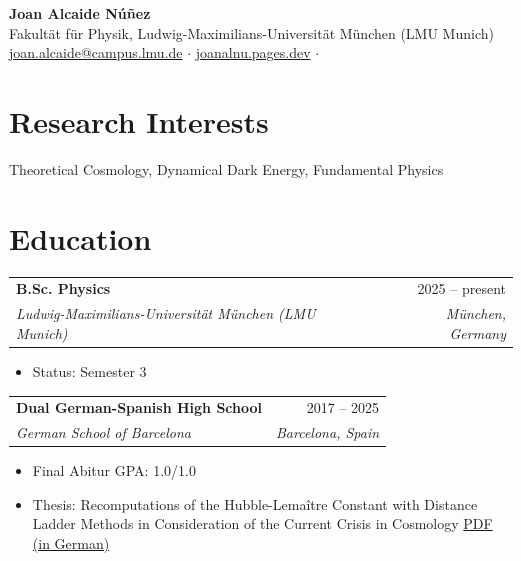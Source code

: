 \documentclass[11pt, letterpaper]{article}
\makeatletter
\newcommand{\cvheading}[4]{
  \noindent
  \begin{tabular*}{\textwidth}{@{\extracolsep{\fill}} lr}
    \textbf{#1} & #2 \\
    \textit{#3} & \textit{#4} \\
  \end{tabular*}\vspace{-2pt}
}
\makeatother
\begin{document}
\begin{center}
    {\Huge \bfseries \color{primary} Joan Alcaide Núñez} \\[6pt]
    Fakultät für Physik, Ludwig-Maximilians-Universität München (LMU Munich) \\
    \href{mailto:joan.alcaide@campus.lmu.de}{joan.alcaide@campus.lmu.de} $\cdot$ 
    \href{https://joanalnu.pages.dev}{joanalnu.pages.dev} $\cdot$ 
\end{center}

\vspace{-6pt}

\section{Research Interests}
Theoretical Cosmology, Dynamical Dark Energy, Fundamental Physics

\section{Education}

\cvheading
  {B.Sc. Physics} {2025 -- present}
  {Ludwig-Maximilians-Universität München (LMU Munich)} {München, Germany}
  \begin{itemize}[noitemsep, topsep=1pt, leftmargin=1.5em]
      \item Status: Semester 3
  \end{itemize}

\vspace{4pt}

\cvheading
  {Dual German-Spanish High School} {2017 -- 2025}
  {German School of Barcelona} {Barcelona, Spain}
  \begin{itemize}[noitemsep, topsep=1pt, leftmargin=1.5em]
      \item Final Abitur GPA: 1.0/1.0
      \item Thesis: Recomputations of the Hubble-Lemaître Constant with Distance Ladder Methods in Consideration of the Current Crisis in Cosmology \href{https://joanlanu.pages.dev/todo}{PDF (in German)}
  \end{itemize}

\end{document}

